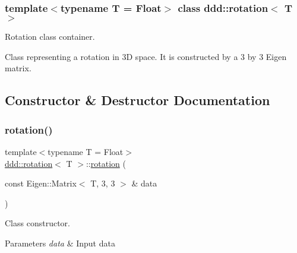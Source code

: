 \subsubsection*{template$<$typename T = Float$>$\newline
class ddd\+::rotation$<$ T $>$}

Rotation class container. 

Class representing a rotation in 3D space. It is constructed by a 3 by 3 Eigen matrix. 

\subsection{Constructor \& Destructor Documentation}
\mbox{\label{classddd_1_1rotation_a10b7bcc20f352a49767460ebde9a1fcf}} 
\subsubsection{\texorpdfstring{rotation()}{rotation()}\hspace{0.1cm}{\footnotesize\ttfamily [1/2]}}
{\footnotesize\ttfamily template$<$typename T  = Float$>$ \\
\hyperlink{classddd_1_1rotation}{ddd\+::rotation}$<$ T $>$\+::\hyperlink{classddd_1_1rotation}{rotation} (\begin{DoxyParamCaption}\item[{const Eigen\+::\+Matrix$<$ T, 3, 3 $>$ \&}]{data }\end{DoxyParamCaption})\hspace{0.3cm}{\ttfamily [inline]}}



Class constructor. 


\begin{DoxyParams}{Parameters}
{\em data} & Input data \\
\hline
\end{DoxyParams}
\mbox{\label{classddd_1_1rotation_a2b0e5637ae25ce6fc706f50d49f885e7}} 
